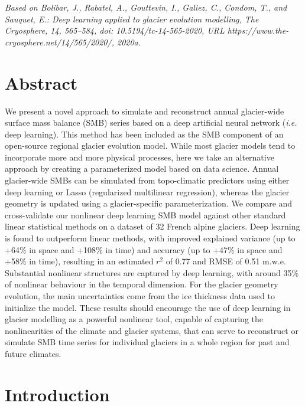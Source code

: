 \textit{Based on Bolibar, J., Rabatel, A., Gouttevin, I., Galiez, C., Condom, T., and Sauquet, E.: Deep learning applied to glacier evolution modelling, The Cryosphere, 14, 565–584, doi: 10.5194/tc-14-565-2020, URL https://www.the-cryosphere.net/14/565/2020/, 2020a.}

\section{Abstract}
We present a novel approach to simulate and reconstruct annual glacier-wide surface mass balance (SMB) series based on a deep artificial neural network (\textit{i.e.} deep learning). This method has been included as the SMB component of an open-source regional glacier evolution model. While most glacier models tend to incorporate more and more physical processes, here we take an alternative approach by creating a parameterized model based on data science. Annual glacier-wide SMBs can be simulated from topo-climatic predictors using either deep learning or Lasso (regularized multilinear regression), whereas the glacier geometry is updated using a glacier-specific parameterization. We compare and cross-validate our nonlinear deep learning SMB model against other standard linear statistical methods on a dataset of 32 French alpine glaciers. Deep learning is found to outperform linear methods, with improved explained variance (up to +64\% in space and +108\% in time) and accuracy (up to +47\% in space and +58\% in time), resulting in an estimated \(r^2\) of 0.77 and RMSE of 0.51 m.w.e. Substantial nonlinear structures are captured by deep learning, with around 35\% of nonlinear behaviour in the temporal dimension. For the glacier geometry evolution, the main uncertainties come from the ice thickness data used to initialize the model. These results should encourage the use of deep learning in glacier modelling as a powerful nonlinear tool, capable of capturing the nonlinearities of the climate and glacier systems, that can serve to reconstruct or simulate SMB time series for individual glaciers in a whole region for past and future climates. 


\section{Introduction} \label{methods:intro}

